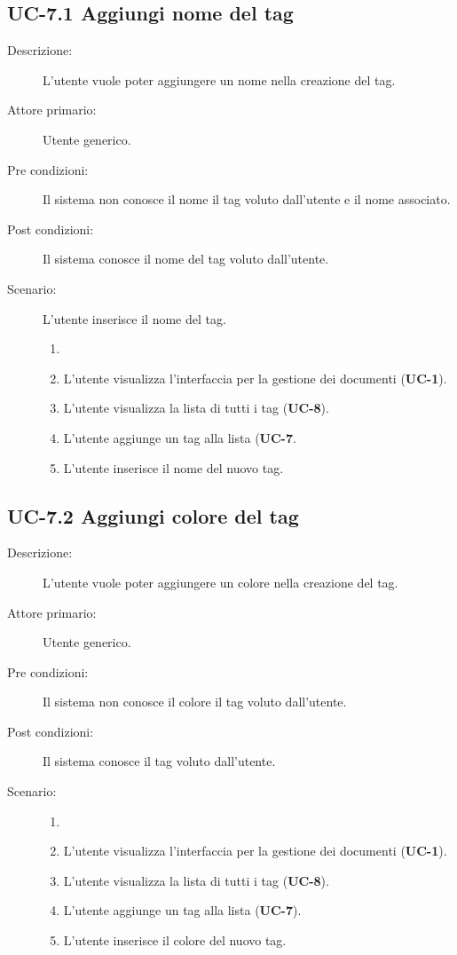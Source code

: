 \subsection{UC-7.1 Aggiungi nome del tag}
\begin{description}
    \item[Descrizione:] L’utente vuole poter aggiungere un nome nella creazione del tag.
    \item[Attore primario:] Utente generico.
    \item[Pre condizioni:] Il sistema non conosce il nome  il tag voluto dall’utente e il nome associato.
    \item[Post condizioni:] Il sistema conosce il nome del tag voluto dall’utente.
    \item[Scenario:] L’utente inserisce il nome del tag.
    \begin{enumerate}
        \item[] 
        \item L’utente visualizza l'interfaccia per la gestione dei documenti (\textbf{UC-1}).
        \item L’utente visualizza la lista di tutti i tag (\textbf{UC-8}).
        \item L'utente aggiunge un tag alla lista (\textbf{UC-7}.
        \item L'utente inserisce il nome del nuovo tag.
    \end{enumerate}
\end{description}

\subsection{UC-7.2 Aggiungi colore del tag}
\begin{description}
    \item[Descrizione:] L’utente vuole poter aggiungere un colore nella creazione del tag.
    \item[Attore primario:] Utente generico.
    \item[Pre condizioni:] Il sistema non conosce il colore il tag voluto dall’utente.
    \item[Post condizioni:] Il sistema conosce il tag voluto dall’utente.
    \item[Scenario:]
    \begin{enumerate}
        \item[] 
        \item L’utente visualizza l'interfaccia per la gestione dei documenti (\textbf{UC-1}).
        \item L’utente visualizza la lista di tutti i tag (\textbf{UC-8}).
        \item L'utente aggiunge un tag alla lista (\textbf{UC-7}).
        \item L'utente inserisce il colore del nuovo tag.
    \end{enumerate}
\end{description}

